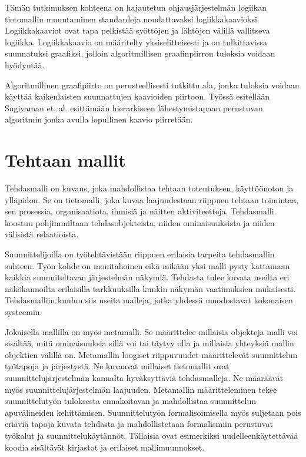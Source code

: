 \documentclass[finnish,12pt]{article}
\begin{document}
Tämän tutkimuksen kohteena on hajautetun ohjausjärjestelmän logiikan
tietomallin muuntaminen standardeja noudattavaksi logiikkakaavioksi.
Logiikkakaaviot ovat tapa pelkistää syöttöjen ja lähtöjen välillä vallitseva
logiikka. Logiikkakaavio on määritelty yksiselitteisesti ja on tulkittavissa
suunnatuksi graafiksi, jolloin algoritmillisen graafinpiirron tuloksia voidaan
hyödyntää.

Algoritmillinen graafipiirto on perusteellisesti tutkittu ala, jonka tuloksia
voidaan käyttää kaikenlaisten suunnattujen kaavioiden piirtoon. Työssä esitellään
Sugiyaman et. al. \cite{RefWorks:9} esittämään hierarkiseen lähestymistapaan
perustuvan algoritmin jonka avulla lopullinen kaavio piirretään.


	\clearpage
	\section{Tehtaan mallit}

Tehdasmalli on kuvaus, joka mahdollistaa tehtaan toteutuksen, käyttöönoton ja
ylläpidon. Se on tietomalli, joka kuvaa laajuudestaan riippuen tehtaan toimintaa,
sen prosessia, organisaatiota, ihmisiä ja näitten aktiviteetteja. Tehdasmalli
koostuu pohjimmiltaan tehdasobjekteista, niiden ominaisuuksista ja niiden
välisistä relaatioista. \cite{RefWorks:41}

Suunnittelijoilla on työtehtävistään riippuen erilaisia tarpeita tehdasmallin
suhteen. Työn kohde on monitahoinen eikä mikään yksi malli pysty kattamaan
kaikkia suunniteltavan järjestelmän näkymiä. Tehdasta tulee kuvata useilta eri
näkökannoilta erilaisilla tarkkuuksilla kunkin näkymän vaatimuksien mukaisesti.
Tehdasmalliin kuuluu siis useita malleja, jotka yhdessä muodostavat kokonaisen
systeemin.

Jokaisella mallilla on myös metamalli. Se määrittelee millaisia objekteja malli voi sisältää, mitä ominaisuuksia sillä voi tai täytyy olla ja millaisia yhteyksiä mallin objektien välillä on.
Metamallin loogiset riippuvuudet määrittelevät suunnittelun työtapoja ja järjestystä.
Ne kuvaavat millaiset tietomallit ovat suunnittelujärjestelmän kannalta hyväksyttäviä tehdasmalleja.
Ne määräävät myös suunnittelujärjestelmän laajuuden. Metamallin määritteleminen tekee suunnittelutyön tuloksesta ennakoitavan ja mahdollistaa suunnittelun apuvälineiden kehittämisen. Suunnittelutyön formalisoimisella myös suljetaan pois eriäviä tapoja kuvata tehdasta ja mahdollistetaan formalismiin perustuvat työkalut ja suunnittelukäytännöt. Tällaisia ovat esimerkiksi uudelleenkäytettävää koodia sisältävät kirjastot ja erilaiset mallimuunnokset.
\end{document}
